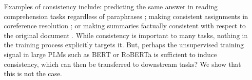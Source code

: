 Examples of consistency include: predicting the same answer in reading comprehension tasks regardless of paraphrases \cite{consistent-qa}; making consistent assignments in coreference resolution \cite{denis2009global,chang2011inference}; or making summaries factually consistent with respect to the original document \cite{kryscinski2020evaluating}.
While consistency is important to many tasks, nothing in the training process explicitly targets it. But, perhaps the unsupervised training signal in large PLMs such as BERT or RoBERTa \cite{bert,roberta} is sufficient to induce consistency, which can then be transferred to downstream tasks? 
We show that this is not the case.



